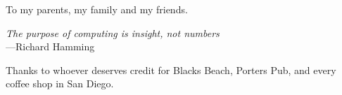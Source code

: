 %
\begin{frontmatter}

%
%
\makefrontmatter 

%
%   
%
%
%
%
\begin{dedication} 
	To my parents, my family and my friends.
\end{dedication}

%   
%



%
%

\begin{epigraph} 
  \emph{The purpose of computing is insight, not numbers}\\
  ---Richard Hamming
\end{epigraph}

%
\tableofcontents
\printglossary[title=List of Abbreviations,toctitle=List of Abbreviations,nonumberlist ]
\listoffigures  %
\listoftables   %

%
%
\begin{acknowledgements} 
 Thanks to whoever deserves credit for Blacks Beach, Porters Pub, and
 every coffee shop in San Diego. 


\end{acknowledgements}
\end{frontmatter}
